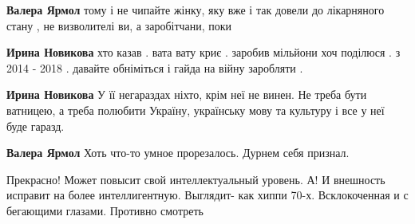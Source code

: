 \begin{itemize}
\begin{itemize}
 
\textbf{Валера Ярмол} тому і не чипайте жінку, яку вже і так довели до лікарняного стану , не визволителі ви, а заробітчани, поки

 
\textbf{Ирина Новикова} хто казав . вата вату криє . заробив мільйони хоч поділюся . з 2014 - 2018 . давайте обніміться і гайда на війну заробляти . 🤣

 
\textbf{Ирина Новикова} У її негараздах ніхто, крім неї не винен. Не треба бути ватницею, а треба полюбити Україну, українську мову та культуру і все у неї буде гаразд.

 
\textbf{Валера Ярмол} Хоть что-то умное прорезалось. Дурнем себя признал.

\end{itemize}

 
Прекрасно! Может повысит свой интеллектуальный уровень. А! И внешность исправит на более интеллигентную. Выглядит- как хиппи 70-х. Всклокоченная и с бегающими глазами. Противно смотреть

 

\end{itemize}
